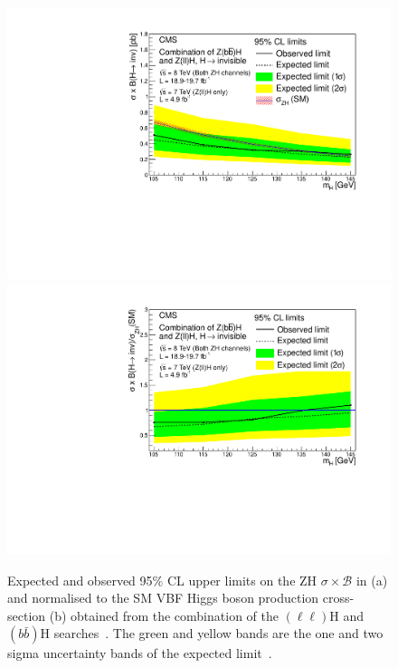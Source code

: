 \begin{figure}
  \includegraphics[width=.65\largefigwidth]{plots/prompt/HIG-13-30-figs/zhxslimit.pdf}
  \includegraphics[width=.65\largefigwidth]{plots/prompt/HIG-13-30-figs/zhlimit.pdf}
  \caption{Expected and observed 95\% \ac{CL} upper limits on the \ac{ZH} $\sigma\times\mathcal{B}$ in \pb (a) and normalised to the SM \ac{VBF} Higgs boson production cross-section (b) obtained from the combination of the \PZ$(\ell\ell)$H and \PZ$(b\bar{b})$H searches~\cite{Chatrchyan:2014tja}. The green and yellow bands are the one and two sigma uncertainty bands of the expected limit~\cite{Chatrchyan:2014tja}.}
  \label{fig:zhcomb}
\end{figure}

